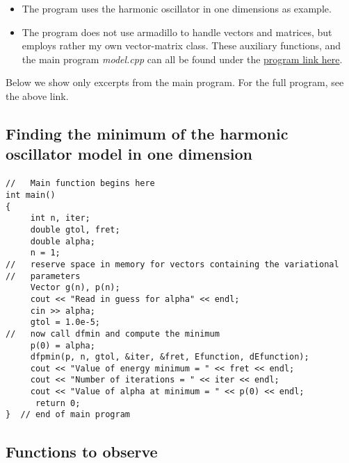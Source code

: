 \documentclass[%
twoside,                 %
final,                   %
10pt]{article}
\begin{document}
\begin{itemize}
\item The program uses the harmonic oscillator in one dimensions as example.

\item The program does not use armadillo to handle vectors and matrices, but employs rather my own vector-matrix class. These auxiliary functions, and the main program \emph{model.cpp} can all be found under the \href{{https://github.com/CompPhysics/ComputationalPhysics2/tree/gh-pages/doc/pub/cg/programs/c%
\end{itemize}

\noindent
Below we show only excerpts from the main program. For the full program, see the above link.




\subsection*{Finding the minimum of the harmonic oscillator model in one dimension}

\paragraph{}
\begin{verbatim}
//   Main function begins here
int main()
{
     int n, iter;
     double gtol, fret;
     double alpha;
     n = 1;
//   reserve space in memory for vectors containing the variational
//   parameters
     Vector g(n), p(n);
     cout << "Read in guess for alpha" << endl;
     cin >> alpha;
     gtol = 1.0e-5;
//   now call dfmin and compute the minimum
     p(0) = alpha;
     dfpmin(p, n, gtol, &iter, &fret, Efunction, dEfunction);
     cout << "Value of energy minimum = " << fret << endl;
     cout << "Number of iterations = " << iter << endl;
     cout << "Value of alpha at minimum = " << p(0) << endl;
      return 0;
}  // end of main program

\end{verbatim}





\subsection*{Functions to observe}
\end{document}
